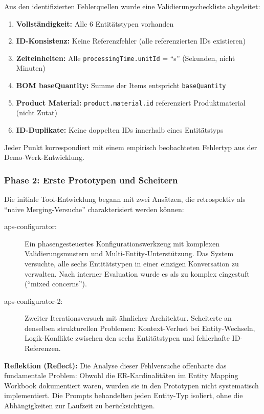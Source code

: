 Aus den identifizierten Fehlerquellen wurde eine Validierungscheckliste abgeleitet:

\begin{enumerate}
    \item \textbf{Vollständigkeit:} Alle 6 Entitätstypen vorhanden
    \item \textbf{ID-Konsistenz:} Keine Referenzfehler (alle referenzierten IDs existieren)
    \item \textbf{Zeiteinheiten:} Alle \texttt{processingTime.unitId} = ``s'' (Sekunden, nicht Minuten)
    \item \textbf{BOM baseQuantity:} Summe der Items entspricht \texttt{baseQuantity}
    \item \textbf{Product Material:} \texttt{product.material.id} referenziert Produktmaterial (nicht Zutat)
    \item \textbf{ID-Duplikate:} Keine doppelten IDs innerhalb eines Entitätstyps
\end{enumerate}

Jeder Punkt korrespondiert mit einem empirisch beobachteten Fehlertyp aus der Demo-Werk-Entwicklung.


\subsubsection{Phase 2: Erste Prototypen und Scheitern}
\label{subsubsec:Phase2}

Die initiale Tool-Entwicklung begann mit zwei Ansätzen, die retrospektiv als ``naive Merging-Versuche'' charakterisiert werden können:

\begin{description}
    \item[aps-configurator:] Ein phasengesteuertes Konfigurationswerkzeug mit komplexen Validierungsmustern und Multi-Entity-Unterstützung. Das System versuchte, alle sechs Entitätstypen in einer einzigen Konversation zu verwalten. Nach interner Evaluation wurde es als zu komplex eingestuft (``mixed concerns'').

    \item[aps-configurator-2:] Zweiter Iterationsversuch mit ähnlicher Architektur. Scheiterte an denselben strukturellen Problemen: Kontext-Verlust bei Entity-Wechseln, Logik-Konflikte zwischen den sechs Entitätstypen und fehlerhafte ID-Referenzen.
\end{description}

\textbf{Reflektion (Reflect):} Die Analyse dieser Fehlversuche offenbarte das fundamentale Problem: Obwohl die ER-Kardinalitäten im Entity Mapping Workbook dokumentiert waren, wurden sie in den Prototypen nicht systematisch implementiert. Die Prompts behandelten jeden Entity-Typ isoliert, ohne die Abhängigkeiten zur Laufzeit zu berücksichtigen.


